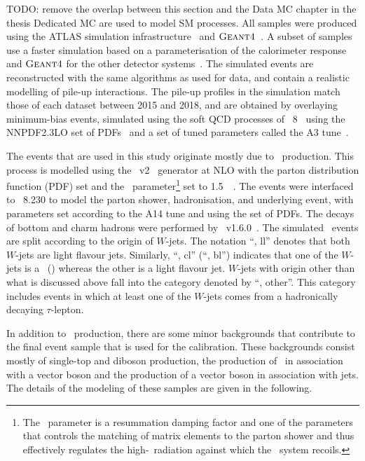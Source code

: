 \documentclass[letterpaper,12pt]{article}
\begin{document}
TODO: remove the overlap between this section and the Data MC chapter in the thesis
Dedicated MC are used to model SM processes. 
All samples were 
produced using the ATLAS simulation infrastructure~\cite{SOFT-2010-01}
and $\textsc{Geant}4$~\cite{Agostinelli:2002hh}. A subset of samples use a faster 
simulation based on a parameterisation of the calorimeter response and 
$\textsc{Geant}4$ for the other detector systems~\cite{SOFT-2010-01}. %
The simulated events are reconstructed with the same algorithms as
used for data, and contain a realistic modelling of pile-up
interactions. The pile-up profiles in the simulation match those of each dataset
between 2015 and 2018, and are obtained by overlaying minimum-bias events,
simulated using the soft QCD processes of
{\PYTHIA}~8~\cite{Sjostrand:2014zea} using the NNPDF2.3LO set of
PDFs~\cite{Ball:2012cx} and a set of tuned
parameters called the A3 tune~\cite{ATL-PHYS-PUB-2016-017}.

The events that are used in this study originate mostly due to 
\ttbar\ production. This process is modelled using the
\powhegbox~v2~\cite{Frixione:2007nw,Nason:2004rx,Frixione:2007vw,Alioli:2010xd}
generator at NLO with the \nnpdfnlo %
parton distribution function (PDF) set
and the \hdamp\ parameter\footnote{The
  \hdamp\ parameter is a resummation damping factor and one of the
  parameters that controls the matching of \powheg matrix elements to
  the parton shower and thus effectively regulates the
  high-\pt\ radiation against which the \ttbar\ system recoils.} set
to 1.5~\mtop~\cite{ATL-PHYS-PUB-2016-020}.  The events were interfaced
to {\PYTHIA}~8.230 to model the parton shower,
hadronisation, and underlying event, with parameters set according
to the A14 tune and using the \nnpdftwo set of PDFs.
The decays of bottom and charm hadrons were performed by \evtgen~v1.6.0~\cite{EvtGen}.
 The simulated \ttbar\
events are split according to the origin of $W$-jets. The notation
``\ttbar, ll'' denotes that both $W$-jets are light flavour jets.
Similarly, ``\ttbar, cl'' (``\ttbar, bl'') 
indicates that one of the $W$-jets is a \cjet\ (\bjet)
whereas the other is a light flavour jet. $W$-jets with origin
other than what is discussed above fall into the 
category denoted by ``\ttbar, other''. This category includes
events in which at least one of the $W$-jets comes from a
hadronically decaying $\tau$-lepton. 

In addition to \ttbar\ production, there are some minor backgrounds
that contribute to the final event sample that is used for the calibration.
These backgrounds consist mostly of single-top and diboson production, 
the production of \ttbar\ in association with a vector boson
and the production of a vector boson in association with jets.
The details
of the modeling of these samples are given in the following.
\end{document}
